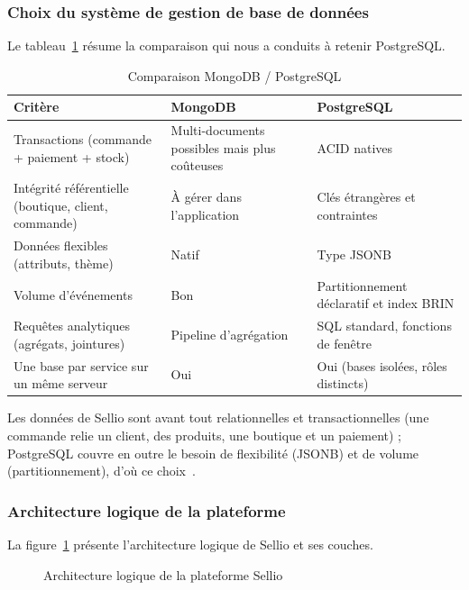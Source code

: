 \subsubsection{Choix du système de gestion de base de données}
 Le tableau~\ref{tab:choix-sgbd} résume la comparaison qui nous a conduits à retenir PostgreSQL.
\begin{table}[H]
\centering
\renewcommand{\arraystretch}{1.4}
\begin{tabular}{|p{4cm}|p{5.3cm}|p{5.3cm}|}
\hline
\textbf{Critère} & \textbf{MongoDB} & \textbf{PostgreSQL} \\
\hline
Transactions (commande + paiement + stock) & Multi-documents possibles mais plus coûteuses & ACID natives \\
\hline
Intégrité référentielle (boutique, client, commande) & À gérer dans l'application & Clés étrangères et contraintes \\
\hline
Données flexibles (attributs, thème) & Natif & Type JSONB \\
\hline
Volume d'événements & Bon & Partitionnement déclaratif et index BRIN \\
\hline
Requêtes analytiques (agrégats, jointures) & Pipeline d'agrégation & SQL standard, fonctions de fenêtre \\
\hline
Une base par service sur un même serveur & Oui & Oui (bases isolées, rôles distincts) \\
\hline
\end{tabular}
\caption{Comparaison MongoDB / PostgreSQL}
\label{tab:choix-sgbd}
\end{table}
Les données de Sellio sont avant tout relationnelles et transactionnelles (une commande relie un client, des produits, une boutique et un paiement) ; PostgreSQL couvre en outre le besoin de flexibilité (JSONB) et de volume (partitionnement), d'où ce choix~\cite{postgresql2026}.

\subsubsection{Architecture logique de la plateforme}
La figure~\ref{fig:archi_logique} présente l'architecture logique de Sellio et ses couches.
\begin{figure}[H]
\centering
{}
\caption{Architecture logique de la plateforme Sellio}
\label{fig:archi_logique}
\end{figure}

